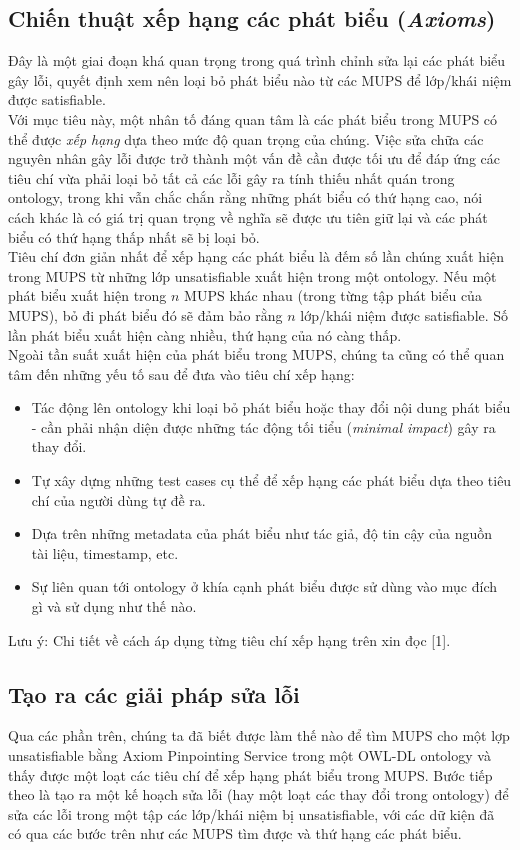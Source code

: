 \subsection{Chiến thuật xếp hạng các phát biểu (\textit{Axioms})}
Đây là một giai đoạn khá quan trọng trong quá trình chỉnh sửa lại các phát biểu gây lỗi, quyết định xem nên loại bỏ phát biểu nào từ các MUPS để lớp/khái niệm được satisfiable.
\\\hspace*{.05\textwidth} Với mục tiêu này, một nhân tố đáng quan tâm là các phát biểu trong MUPS có thể được \textit{xếp hạng} dựa theo mức độ quan trọng của chúng. Việc sửa chữa các nguyên nhân gây lỗi được trở thành một vấn đề cần được tối ưu để đáp ứng các tiêu chí vừa phải loại bỏ tất cả các lỗi gây ra tính thiếu nhất quán trong ontology, trong khi vẫn chắc chắn rằng những phát biểu có thứ hạng cao, nói cách khác là có giá trị quan trọng về nghĩa sẽ được ưu tiên giữ lại và các phát biểu có thứ hạng thấp nhất sẽ bị loại bỏ.
\\\hspace*{.05\textwidth} Tiêu chí đơn giản nhất để xếp hạng các phát biểu là đếm số lần chúng xuất hiện trong MUPS từ những lớp unsatisfiable xuất hiện trong một ontology. Nếu một phát biểu xuất hiện trong $n$ MUPS khác nhau (trong từng tập phát biểu của MUPS), bỏ đi phát biểu đó sẽ đảm bảo rằng $n$ lớp/khái niệm được satisfiable. Số lần phát biểu xuất hiện càng nhiều, thứ hạng của nó càng thấp.
\\\hspace*{0.05\textwidth} Ngoài tần suất xuất hiện của phát biểu  trong MUPS, chúng ta cũng có thể quan tâm đến những yếu tố sau để đưa vào tiêu chí xếp hạng:
\begin{itemize}
\item Tác động lên ontology khi loại bỏ phát biểu hoặc thay đổi nội dung phát biểu - cần phải nhận diện được những tác động tối tiểu (\textit{minimal impact})  gây ra thay đổi.
\item Tự xây dựng những test cases cụ thể để xếp hạng các phát biểu dựa theo tiêu chí của người dùng tự đề ra.
\item Dựa trên những metadata của phát biểu như tác giả, độ tin cậy của nguồn tài liệu, timestamp, etc.
\item Sự liên quan tới ontology ở khía cạnh phát biểu được sử dùng vào mục đích gì và sử dụng như thế nào.
\end{itemize}
Lưu ý: Chi tiết về cách áp dụng từng tiêu chí xếp hạng trên xin đọc [1].
\subsection{Tạo ra các giải pháp sửa lỗi}
Qua các phần trên, chúng ta đã biết được làm thế nào để tìm MUPS cho một lợp unsatisfiable bằng Axiom Pinpointing Service trong một OWL-DL ontology và thấy được một loạt các tiêu chí để xếp hạng phát biểu trong MUPS. Bước tiếp theo là tạo ra một kế hoạch sửa lỗi (hay một loạt các thay đổi trong ontology) để sửa các lỗi trong một tập các lớp/khái niệm bị unsatisfiable, với các dữ kiện đã có qua các bước trên như các MUPS tìm được và thứ hạng các phát biểu.
